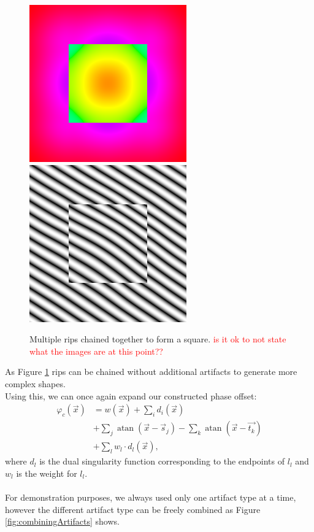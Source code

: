 \documentclass{utue} %
\DeclareMathOperator{\atan}{atan}
\begin{document}
\begin{figure}[ht]
  \centering
  \includegraphics[width=0.45\linewidth]{images/ripChainingPhase}
  \includegraphics[width=0.45\linewidth]{images/ripChaining}
  \caption{Multiple rips chained together to form a square. \textcolor{red}{is it ok to not state what the images are at this point??}}\label{fig:ripChaining}
\end{figure}

As Figure \ref{fig:ripChaining} rips can be chained without additional artifacts to generate more complex shapes.\\
Using this, we can once again expand our constructed phase offset:
\begin{align*}
  \varphi_c(\vec{x})&=w(\vec{x}) +\sum_i d_i(\vec{x})\\
  & + \sum_j \atan(\vec{x}-\vec{s}_j) - \sum_k \atan(\vec{x}-\vec{t_k})\\
  & + \sum_l w_l\cdot d_l(\vec{x}),
\end{align*}
where $d_l$ is the dual singularity function corresponding to the endpoints of $l_l$ and $w_l$ is the weight for $l_l$.\\
\\
For demonstration purposes, we always used only one artifact type at a time, however the different artifact type can be freely combined as Figure \ref{fig:combiningArtifacts} shows.
\end{document}
